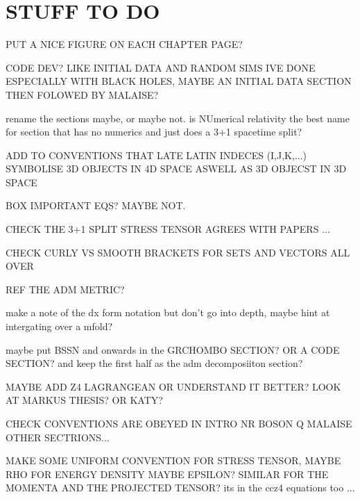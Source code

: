\documentclass[11pt]{report}  %
\numberwithin{equation}{section}
\begin{document}

% 






% 







\chapter{STUFF TO DO}
PUT A NICE FIGURE ON EACH CHAPTER PAGE?

CODE DEV? LIKE INITIAL DATA AND RANDOM SIMS IVE DONE ESPECIALLY WITH BLACK HOLES, MAYBE AN INITIAL DATA SECTION THEN FOLOWED BY MALAISE?

rename the sections maybe, or maybe not. is NUmerical relativity the best name for section that has no numerics and just does a 3+1 spacetime split?

ADD TO CONVENTIONS THAT LATE LATIN INDECES (I,J,K,...) SYMBOLISE 3D OBJECTS IN 4D SPACE ASWELL AS 3D OBJECST IN 3D SPACE

BOX IMPORTANT EQS? MAYBE NOT.

CHECK THE 3+1 SPLIT STRESS TENSOR AGREES WITH PAPERS ...

CHECK CURLY VS SMOOTH BRACKETS FOR SETS AND VECTORS ALL OVER

REF THE ADM METRIC?

make a note of the dx form notation but don't go into depth, maybe hint at intergating over a mfold?

maybe put BSSN and onwards in the GRCHOMBO SECTION? OR A CODE SECTION? and keep the first half as the adm decomposiiton section?

MAYBE ADD Z4 LAGRANGEAN OR UNDERSTAND IT BETTER? LOOK AT MARKUS THESIS? OR KATY?

CHECK CONVENTIONS ARE OBEYED IN
INTRO
NR
BOSON
Q
MALAISE
OTHER SECTRIONS...

MAKE SOME UNIFORM CONVENTION FOR STRESS TENSOR, MAYBE RHO FOR ENERGY DENSITY MAYBE EPSILON? SIMILAR FOR THE MOMENTA AND THE PROJECTED TENSOR? its in the ccz4 equations too ...
\end{document}
